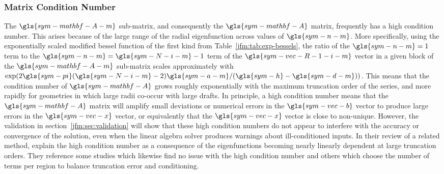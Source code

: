 \documentclass[ASNA,twocolumn]{USG} %
\begin{document}
\subsubsection{Matrix Condition Number}
The $\gls{sym-mathbf-A-m}$ sub-matrix, and consequently the $\gls{sym-mathbf-A}$ matrix, frequently has a high condition number. 
This arises because of the large range of the radial eigenfunction across values of $\gls{sym-n-m}$.
More specifically, using the exponentially scaled modified bessel function of the first kind from Table~\ref{jfm:tab:exp-bessels}, 
the ratio of the $\gls{sym-n-m}=1$ term to the $\gls{sym-n-m}=\gls{sym-N-i-m}-1$ term of the $\gls{sym-vec-R-1-i-m}$ vector in a given block of the $\gls{sym-mathbf-A-m}$ sub-matrix scales approximately with $\exp(2\gls{sym-pi} (\gls{sym-N-i-m}-2) \gls{sym-a-m}/(\gls{sym-h}-\gls{sym-d-m}))$.
This means that the condition number of $\gls{sym-mathbf-A}$ grows roughly exponentially with the maximum truncation order of the series, and more rapidly for geometries in which large radii co-occur with large drafts.
In principle, a high condition number means that the $\gls{sym-mathbf-A}$ matrix will amplify small deviations or numerical errors in the $\gls{sym-vec-b}$ vector to produce large errors in the $\gls{sym-vec-x}$ vector, or equivalently that the $\gls{sym-vec-x}$ vector is close to non-unique.
However, the validation in section~\ref{jfm:sec:validation} will show that these high condition numbers do not appear to interfere with the accuracy or convergence of the solution, even when the linear algebra solver produces warnings about ill-conditioned inputs.
In their review of a related method, \cite[Section 4.3]{hiptmair_survey_2016} explain the high condition number as a consequence of the eigenfunctions becoming nearly linearly dependent at large truncation orders.
They reference some studies which likewise find no issue with the high condition number and others which choose the number of terms per region to balance truncation error and conditioning.
\end{document}

